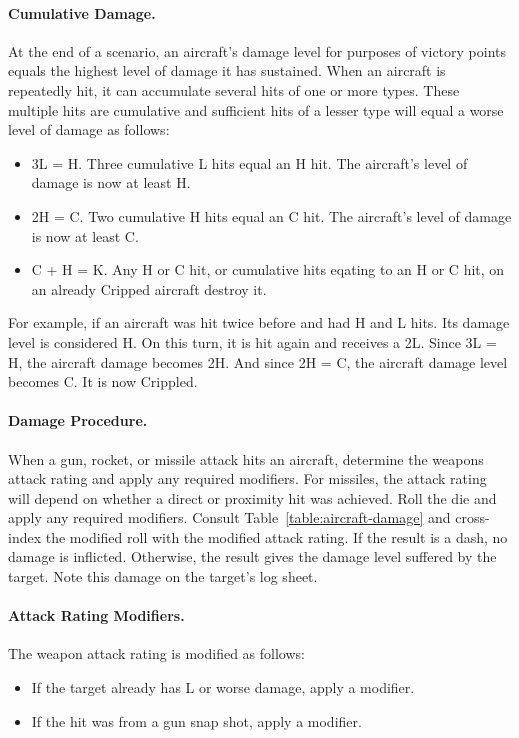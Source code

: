 {

\paragraph{Cumulative Damage.} At the end of a scenario, an aircraft's damage level for purposes of victory points equals the highest level of damage it has sustained. When an aircraft is repeatedly hit, it can accumulate several hits of one or more types. These multiple hits are cumulative and sufficient hits of a lesser type will equal a worse level of damage as follows:

\begin{itemize}
    \item 3L = H. Three cumulative L hits equal an H hit. The aircraft's level of damage is now at least H.
    \item 2H = C. Two cumulative H hits equal an C hit. The aircraft's level of damage is now at least C.
    \item C + H = K. Any H or C hit, or cumulative hits eqating to an H or C hit, on an already Cripped aircraft destroy it.
\end{itemize}

For example, if an aircraft was hit twice before and had H and L hits. Its damage level is considered H. On this turn, it is hit again and receives a 2L. Since 3L = H, the aircraft damage becomes 2H. And since 2H = C, the aircraft damage level becomes C. It is now Crippled.

}{


\paragraph{Damage Procedure.} When a gun, rocket, or missile attack hits an aircraft, determine the weapons attack rating and apply any required modifiers. For missiles, the attack rating will depend on whether a direct or proximity hit was achieved. Roll the die and apply any required modifiers. Consult Table~\ref{table:aircraft-damage} and cross-index the modified roll with the modified attack rating. If the result is a dash, no damage is inflicted. Otherwise, the result gives the damage level suffered by the target. Note this damage on the target's log sheet.

\paragraph{Attack Rating Modifiers.}
The weapon attack rating is modified as follows:
\begin{itemize}
\item If the target already has L or worse damage, apply a  modifier.
\item If the hit was from a gun snap shot, apply a  modifier.
\end{itemize}

}

